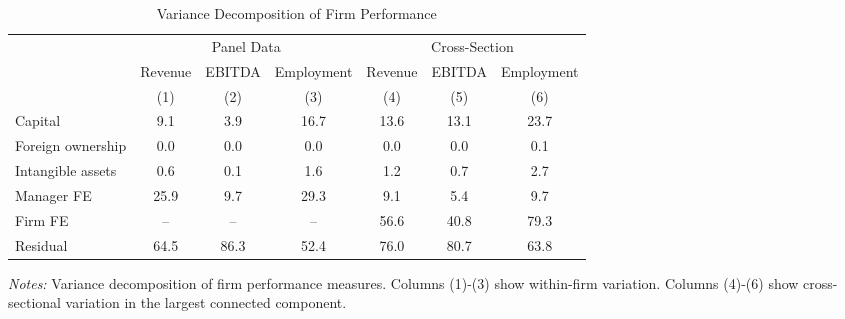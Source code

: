 \begin{table}[htbp]
\centering
\caption{Variance Decomposition of Firm Performance}
\label{tab:variance_decomposition}
\begin{tabular}{l*{6}{c}}
\toprule
 & \multicolumn{3}{c}{Panel Data} & \multicolumn{3}{c}{Cross-Section} \\
\cmidrule(lr){2-4} \cmidrule(lr){5-7}
 & Revenue & EBITDA & Employment & Revenue & EBITDA & Employment \\
 & (1) & (2) & (3) & (4) & (5) & (6) \\
\midrule
Capital &   9.1 &   3.9 &  16.7 &  13.6 &  13.1 &  23.7 \\
Foreign ownership &   0.0 &   0.0 &   0.0 &   0.0 &   0.0 &   0.1 \\
Intangible assets &   0.6 &   0.1 &   1.6 &   1.2 &   0.7 &   2.7 \\
Manager FE &  25.9 &   9.7 &  29.3 &   9.1 &   5.4 &   9.7 \\
Firm FE & -- & -- & -- &  56.6 &  40.8 &  79.3 \\
Residual &  64.5 &  86.3 &  52.4 &  76.0 &  80.7 &  63.8 \\
\bottomrule
\end{tabular}
\begin{minipage}{14cm}
\footnotesize
\textit{Notes:} Variance decomposition of firm performance measures. Columns (1)-(3) show within-firm variation. Columns (4)-(6) show cross-sectional variation in the largest connected component. \end{minipage}
\end{table}
